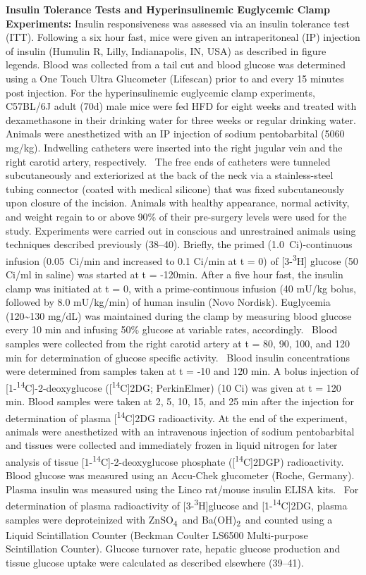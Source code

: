 \documentclass[11pt]{article} %
\begin{document}
\textbf{Insulin Tolerance Tests and Hyperinsulinemic Euglycemic Clamp
Experiments:} Insulin responsiveness was assessed via an insulin
tolerance test (ITT). Following a six hour fast, mice were given an
intraperitoneal (IP) injection of insulin (Humulin R, Lilly,
Indianapolis, IN, USA) as described in figure legends. Blood was
collected from a tail cut and blood glucose was determined using a One
Touch Ultra Glucometer (Lifescan) prior to and every 15 minutes post
injection. For the hyperinsulinemic euglycemic clamp experiments,
C57BL/6J adult (70d) male mice were fed HFD for eight weeks and treated
with dexamethasone in their drinking water for three weeks or regular
drinking water. Animals were anesthetized with an IP injection of sodium
pentobarbital (5060 mg/kg). Indwelling catheters were inserted into the
right jugular vein and the right carotid artery, respectively.~ The free
ends of catheters were tunneled subcutaneously and exteriorized at the
back of the neck via a stainless-steel tubing connector (coated with
medical silicone) that was fixed subcutaneously upon closure of the
incision. Animals with healthy appearance, normal activity, and weight
regain to or above 90\% of their pre-surgery levels were used for the
study. Experiments were carried out in conscious and unrestrained
animals using techniques described previously (38--40). Briefly, the
primed (1.0~Ci)-continuous infusion (0.05~Ci/min and increased to 0.1
Ci/min at t = 0) of {[}3-\textsuperscript{3}H{]} glucose (50 Ci/ml in
saline) was started at t = -120min. After a five hour fast, the insulin
clamp was initiated at t = 0, with a prime-continuous infusion (40 mU/kg
bolus, followed by 8.0 mU/kg/min) of human insulin (Novo Nordisk).
Euglycemia (120\textasciitilde{}130 mg/dL) was maintained during the
clamp by measuring blood glucose every 10 min and infusing 50\% glucose
at variable rates, accordingly.~ Blood samples were collected from the
right carotid artery at t = 80, 90, 100, and 120 min for determination
of glucose specific activity.~ Blood insulin concentrations were
determined from samples taken at t = -10 and 120 min. A bolus injection
of {[}1-\textsuperscript{14}C{]}-2-deoxyglucose
({[}\textsuperscript{14}C{]}2DG; PerkinElmer) (10 Ci) was given at t =
120 min. Blood samples were taken at 2, 5, 10, 15, and 25 min after the
injection for determination of plasma {[}\textsuperscript{14}C{]}2DG
radioactivity. At the end of the experiment, animals were anesthetized
with an intravenous injection of sodium pentobarbital and tissues were
collected and immediately frozen in liquid nitrogen for later analysis
of tissue {[}1-\textsuperscript{14}C{]}-2-deoxyglucose phosphate
({[}\textsuperscript{14}C{]}2DGP) radioactivity. Blood glucose was
measured using an Accu-Chek glucometer (Roche, Germany). Plasma insulin
was measured using the Linco rat/mouse insulin ELISA kits.~ For
determination of plasma radioactivity of
{[}3-\textsuperscript{3}H{]}glucose and
{[}1-\textsuperscript{14}C{]}2DG, plasma samples were deproteinized with
ZnSO\textsubscript{4}~and Ba(OH)\textsubscript{2}~and counted using a
Liquid Scintillation Counter (Beckman Coulter LS6500 Multi-purpose
Scintillation Counter). Glucose turnover rate, hepatic glucose
production and tissue glucose uptake were calculated as described
elsewhere (39--41).
\end{document}
